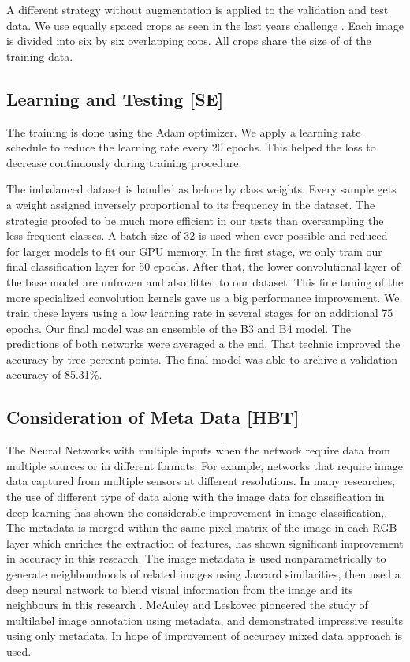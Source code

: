 A different strategy without augmentation is applied to the validation and test data. We use equally spaced crops as seen in the last years challenge \cite{gessert2018skin}.
Each image is divided into six by six overlapping cops. All crops share the size of of the training data. 

\subsection{Learning and Testing [SE]}
The training is done using the Adam optimizer. We apply a learning rate schedule to reduce the learning rate every 20 epochs. This helped the loss to decrease continuously during training procedure. 

The imbalanced dataset is handled as before by class weights. Every sample gets a weight assigned inversely proportional to its frequency in the dataset. The strategie proofed to be much more efficient in our tests than oversampling the less frequent classes. 
A batch size of 32 is used when ever possible and reduced for larger models to fit our GPU memory. 
In the first stage, we only train our final classification layer for 50 epochs. After that, the lower convolutional layer of the base model are unfrozen and also fitted to our dataset. This fine tuning of the more specialized convolution kernels gave us a big performance improvement. We train these layers using a low learning rate in several stages for an additional 75 epochs.  %
Our final model was an ensemble of the B3 and B4 model. The predictions of both networks were averaged a the end. That technic improved the accuracy by tree percent points. The final model was able to archive a validation accuracy of 85.31\%. 

\subsection{Consideration of Meta Data [HBT]}

The Neural Networks with multiple inputs when the network require data from multiple sources or in different formats. For example, networks that require image data captured from multiple sensors at different resolutions. In many researches, the use of different type of data along with the image data for classification in deep learning has shown the considerable improvement in image classification\cite{love},\cite{melan}. The metadata is merged within the same pixel matrix of the image in each RGB layer which enriches the extraction of features, has shown significant improvement in accuracy in this research\cite{melan}. The image metadata is used nonparametrically to generate neighbourhoods of related images using Jaccard similarities, then used a deep neural network to blend visual information from the image and its neighbours in this research \cite{love}. McAuley and Leskovec pioneered the study of multilabel image annotation using metadata, and demonstrated impressive results using only metadata. In hope of improvement of accuracy mixed data approach is used.

